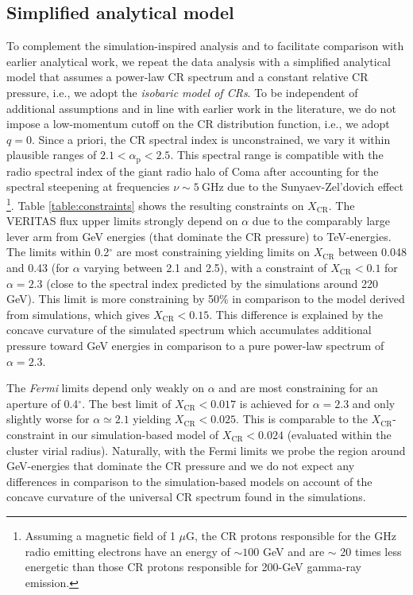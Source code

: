 \documentclass[12pt,manuscript]{aastex}
\newcommand{\rmn}{\mathrm}
\newcommand{\CR}{\mathrm{CR}}
\begin{document}
\subsection{Simplified analytical model}
To complement the simulation-inspired analysis and to facilitate comparison with earlier analytical
work, we repeat the data analysis with a simplified analytical model that assumes a power-law CR
spectrum and a constant relative CR pressure, i.e., we adopt the {\em isobaric model of CRs}. To be
independent of additional assumptions and in line with earlier work in the literature, we do not
impose a low-momentum cutoff on the CR distribution function, i.e., we adopt $q=0$. Since a priori,
the CR spectral index is unconstrained, we vary it within plausible ranges of
$2.1<\alpha_{\rmn{p}}<2.5$. This spectral range is compatible with the radio spectral index of the
giant radio halo of Coma after accounting for the spectral steepening at frequencies
$\nu\sim5~\rmn{GHz}$ due to the Sunyaev-Zel'dovich effect
\citep{article:PfrommerEnsslin:2004b}\footnote{Assuming a magnetic field of 1 $\mu$G, the CR
protons responsible for the GHz radio emitting electrons have an energy of $\sim100$ GeV and are
$\sim$ 20 times less energetic than those CR protons responsible for 200-GeV gamma-ray emission.}.
Table \ref{table:constraints} shows the resulting constraints on $X_\CR$. The VERITAS flux upper
limits strongly depend on $\alpha$ due to the comparably large lever arm from GeV energies (that
dominate the CR pressure) to TeV-energies. The limits within 0.2$^{\circ}$ are most constraining
yielding limits on $X_\CR$ between 0.048 and 0.43 (for $\alpha$ varying between 2.1 and 2.5), with
a constraint of $X_\CR<0.1$ for $\alpha=2.3$ (close to the spectral index predicted by the
simulations around 220 GeV). This limit is more constraining by 50\% in comparison to the model
derived from simulations, which gives $X_\CR<0.15$. This difference is explained by the concave
curvature of the simulated spectrum which accumulates additional pressure toward GeV energies in
comparison to a pure power-law spectrum of $\alpha=2.3$.

The {\em Fermi} limits depend only weakly on $\alpha$ and are most constraining for an aperture of
0.4$^{\circ}$.  The best limit of $X_\CR< 0.017$ is achieved for $\alpha=2.3$ and only slightly
worse for $\alpha\simeq 2.1$ yielding $X_\CR<0.025$.  This is comparable to the $X_\CR$-constraint
in our simulation-based model of $X_\CR<0.024$ (evaluated within the cluster virial radius).
Naturally, with the Fermi limits we probe the region around GeV-energies that dominate the CR
pressure and we do not expect any differences in comparison to the simulation-based models on
account of the concave curvature of the universal CR spectrum found in the simulations.
\end{document}
